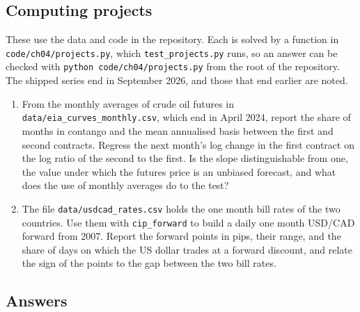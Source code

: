 \begin{chapterrefs}
\subsection*{Computing projects}
\label{sec4:projects}
These use the data and code in the repository. Each is solved by a function in
\texttt{code/ch04/projects.py}, which \texttt{test\_projects.py} runs, so an answer can be
checked with \texttt{python code/ch04/projects.py} from the root of the repository. The
shipped series end in September 2026, and those that end earlier are noted.

\begin{enumerate}[label=\textbf{P4.\arabic*}, leftmargin=*, ref=P4.\arabic*]
\item From the monthly averages of crude oil futures in \texttt{data/eia\_curves\_monthly.csv}, which end in
April 2024, report the share of months in contango and the mean annualised basis between the first and
second contracts. Regress the next month's log change in the first contract on the log ratio of the
second to the first. Is the slope distinguishable from one, the value under which the futures price is
an unbiased forecast, and what does the use of monthly averages do to the test?
\item The file \texttt{data/usdcad\_rates.csv} holds the one month bill rates of the two countries.
Use them with \texttt{cip\_forward} to build a daily one month USD/CAD forward from 2007. Report the forward
points in pips, their range, and the share of days on which the US dollar trades at a forward discount,
and relate the sign of the points to the gap between the two bill rates.
\end{enumerate}

\subsection*{Answers}


\end{chapterrefs}
